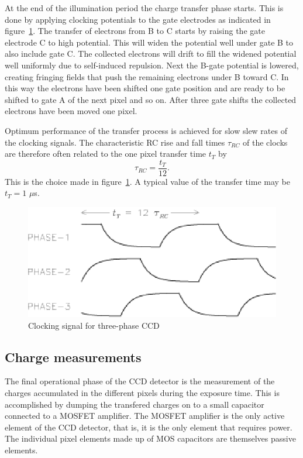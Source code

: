 \documentclass{article}
\begin{document}
At the end of the illumination period the charge transfer phase
starts. This is done by applying clocking potentials to the gate
electrodes as indicated in figure~\ref{CCD.figclocking}. The transfer
of electrons from B to C starts by raising the gate electrode C to
high potential. This will widen the potential well under gate B to
also include gate C. The collected electrons will drift to fill the
widened potential well uniformly due to self-induced repulsion. Next
the B-gate potential is lowered, creating fringing fields that push
the remaining electrons under B toward C. In this way the electrons
have been shifted one gate position and are ready to be shifted to
gate A of the next pixel and so on. After three gate shifts the
collected electrons have been moved one pixel.

Optimum performance of the transfer process is achieved for slow slew
rates of the clocking signals. The characteristic RC rise and fall times
 $\tau_{RC}$ of the clocks are therefore often related to the one pixel
transfer time $t_T$ by
\begin{equation}
  \tau_{RC} = \frac{t_T}{12}.
\end{equation}
This is the choice made in figure~\ref{CCD.figclocking}. A typical
value of the transfer time may be $t_T = 1$ $\mu$s.

\begin{figure}[h]
  \centering
	\includegraphics{CCD_clocking.eps}
  \caption{Clocking signal for three-phase CCD}
  \label{CCD.figclocking}
\end{figure}


\subsection*{Charge measurements} 

The final operational phase of the CCD detector is the measurement of
the charges accumulated in the different pixels during the exposure
time. This is accomplished by dumping the transfered charges on to a
small capacitor connected to a MOSFET amplifier. The MOSFET amplifier
is the only active element of the CCD detector, that is, it is the
only element that requires power. The individual pixel elements made
up of MOS capacitors are themselves passive elements.
\end{document}
